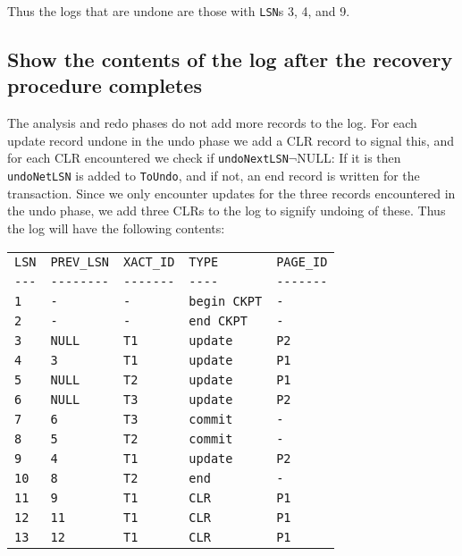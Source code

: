 \documentclass{article}
\begin{document}
Thus the logs that are undone are those with \verb|LSN|s 3, 4, and 9.

\subsection{Show the contents of the log after the recovery procedure completes}

The analysis and redo phases do not add more records to the log. For each update record undone in the undo phase we add a CLR record to signal this, and for each CLR encountered we check if \verb|undoNextLSN|$\neg$NULL: If it is then \verb|undoNetLSN| is added to \verb|ToUndo|, and if not, an end record is written for the transaction. Since we only encounter updates for the three records encountered in the undo phase, we add three CLRs to the log to signify undoing of these. Thus the log will have the following contents:

\begin{table}[h]
    \centering
    \begin{tabular}{lllll}
        \verb|LSN| & \verb|PREV_LSN| & \verb|XACT_ID| & \verb|TYPE| & \verb|PAGE_ID| \\
        \verb|---| & \verb|--------| & \verb|-------| & \verb|----| & \verb|-------| \\
        \verb|1| & \verb|-| & \verb|-| & \verb|begin CKPT| & \verb|-| \\
        \verb|2| & \verb|-| & \verb|-| & \verb|end CKPT| & \verb|-| \\
        \verb|3| & \verb|NULL| & \verb|T1| & \verb|update| & \verb|P2| \\
        \verb|4| & \verb|3| & \verb|T1| & \verb|update| & \verb|P1| \\
        \verb|5| & \verb|NULL| & \verb|T2| & \verb|update| & \verb|P1| \\
        \verb|6| & \verb|NULL| & \verb|T3| & \verb|update| & \verb|P2| \\
        \verb|7| & \verb|6| & \verb|T3| & \verb|commit| & \verb|-| \\
        \verb|8| & \verb|5| & \verb|T2| & \verb|commit| & \verb|-| \\
        \verb|9| & \verb|4| & \verb|T1| & \verb|update| & \verb|P2| \\
        \verb|10| & \verb|8| & \verb|T2| & \verb|end| & \verb|-| \\
        \verb|11| & \verb|9| & \verb|T1| & \verb|CLR| & \verb|P1| \\
        \verb|12| & \verb|11| & \verb|T1| & \verb|CLR| & \verb|P1| \\
        \verb|13| & \verb|12| & \verb|T1| & \verb|CLR| & \verb|P1| \\
    \end{tabular}
\end{table}
\end{document}
